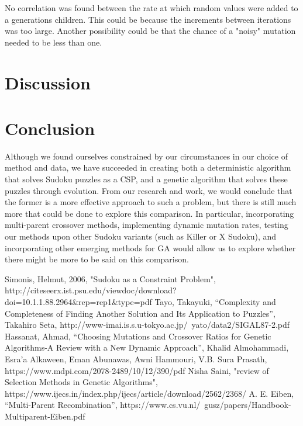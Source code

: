 \documentclass[12pt, conference]{IEEEtran}
\begin{document}
\par
No correlation was found between the rate at which random values were added to a generations children.
This could be because the increments between iterations was too large.
Another possibility could be that the chance of a "noisy" mutation needed to be less than one.


\section[h!]{Discussion}



\section{Conclusion}

Although we found ourselves constrained by our circumstances in our choice of method and data, we have succeeded in creating both a deterministic algorithm that solves Sudoku puzzles as a CSP, and a genetic algorithm that solves these puzzles through evolution.
 From our research and work, we would conclude that the former is a more effective approach to such a problem, but there is still much more that could be done to explore this comparison. 
In particular, incorporating multi-parent crossover methods, implementing dynamic mutation rates, testing our methods upon other Sudoku variants (such as Killer or X Sudoku), and incorporating other emerging methods for GA would allow us to explore whether there might be more to be said on this comparison.

\begin{thebibliography}{00}

Simonis, Helmut, 2006, "Sudoku as a Constraint Problem", http://citeseerx.ist.psu.edu/viewdoc/download?doi=10.1.1.88.2964\&rep=rep1\&type=pdf
Tayo, Takayuki, “Complexity and Completeness of Finding Another Solution and Its Application to Puzzles”, Takahiro Seta, http://www-imai.is.s.u-tokyo.ac.jp/~yato/data2/SIGAL87-2.pdf
Hassanat, Ahmad, “Choosing Mutations and Crossover Ratios for Genetic Algorithms-A Review with a New Dynamic Approach”,  Khalid Almohammadi, Esra’a Alkaween, Eman Abunawas, Awni Hammouri, V.B. Sura Prasath, https://www.mdpi.com/2078-2489/10/12/390/pdf 
Nisha Saini, "review of Selection Methods in Genetic Algorithms", https://www.ijecs.in/index.php/ijecs/article/download/2562/2368/
A. E. Eiben, “Multi-Parent Recombination”, https://www.cs.vu.nl/~gusz/papers/Handbook-Multiparent-Eiben.pdf

\end{thebibliography}
\end{document}
